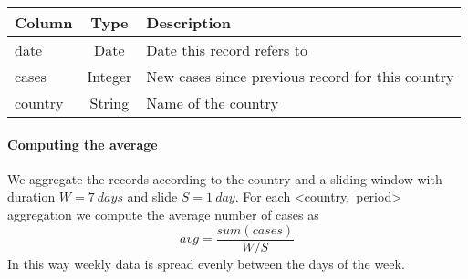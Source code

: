 \begin{center}
    \begin{tabu}{l c X}
        \toprule
        \rowfont{\sffamily\bfseries}
        Column  & Type    & Description                                      \\
        \midrule
        date    & Date    & Date this record refers to                       \\
        cases   & Integer & New cases since previous record for this country \\
        country & String  & Name of the country                              \\
        \bottomrule
    \end{tabu}
\end{center}

\pagebreak

\paragraph{Computing the average}
We aggregate the records according to the country and a sliding window with duration $W = \SI{7}{days}$ and slide $S = \SI{1}{day}$.
For each <country,~period> aggregation we compute the average number of cases as
\[
    avg = \frac{sum(cases)}{W / S}
\]
In this way weekly data is spread evenly between the days of the week.

